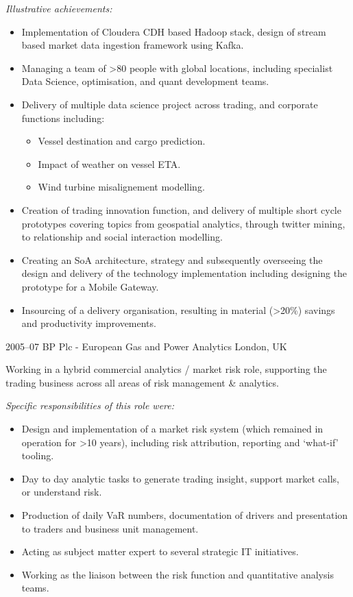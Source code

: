 \documentclass[]{friggeri-cv}
\begin{document}
\vspace{0.2cm} \emph{Illustrative achievements:}
\begin{itemize}
	\item Implementation of Cloudera CDH based Hadoop stack, design of stream based market data ingestion framework using Kafka.
	\item Managing a team of >80 people with global locations, including specialist Data Science, optimisation, and quant development teams.
	\item Delivery of multiple data science project across trading, and corporate functions including:
	\begin{itemize}
		\item Vessel destination and cargo prediction.
		\item Impact of weather on vessel ETA.
		\item Wind turbine misalignement modelling.
	\end{itemize}
	\item Creation of trading innovation function, and delivery of multiple short cycle prototypes covering topics from geospatial analytics, through twitter mining, to relationship and social interaction modelling.
	\item Creating an SoA architecture, strategy and subsequently overseeing the design and delivery of the technology implementation including designing the prototype for a Mobile Gateway.
	\item Insourcing of a delivery organisation, resulting in material (>20\%) savings and productivity improvements.
\end{itemize}


\begin{entrylist}
\entry
{2005--07}
{BP Plc - European Gas and Power Analytics}
{London, UK}
{}
\end{entrylist}

\vspace{-0.8cm}
Working in a hybrid commercial analytics / market risk role, supporting the trading business across all areas of risk management \& analytics.  

\vspace{0.2cm} \emph{Specific responsibilities of this role were:}
\begin{itemize}
	\item Design and implementation of a market risk system (which remained in operation for >10 years), including risk attribution, reporting and ‘what-if’ tooling.
	\item Day to day analytic tasks to generate trading insight, support market calls, or understand risk.
	\item Production of daily VaR numbers, documentation of drivers and presentation to traders and business unit management.
	\item Acting as subject matter expert to several strategic IT initiatives.
	\item Working as the liaison between the risk function and quantitative analysis teams.
\end{itemize}
\end{document}
